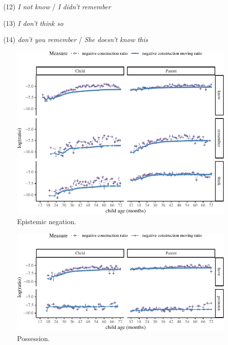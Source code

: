 \documentclass[10pt, letterpaper]{article}
\newenvironment{CodeChunk}{}{}
\begin{document}
~ (12) \emph{I not know} / \emph{I didn't remember}

~ (13) \emph{I don't think so}

~ (14) \emph{don't you remember} / \emph{She doesn't know this}

\begin{figure}[h!]

\begin{CodeChunk}


\begin{center}\includegraphics{figs/epistemic-1} \end{center}

\end{CodeChunk}
\caption[This image spans both columns]{Epistemic negation.}\label{fig:epistemic}
\end{figure}

\begin{figure}[h!]

\begin{CodeChunk}


\begin{center}\includegraphics{figs/possession-1} \end{center}

\end{CodeChunk}
\caption[This image spans both columns]{Possession.}\label{fig:possession}
\end{figure}
\end{document}
